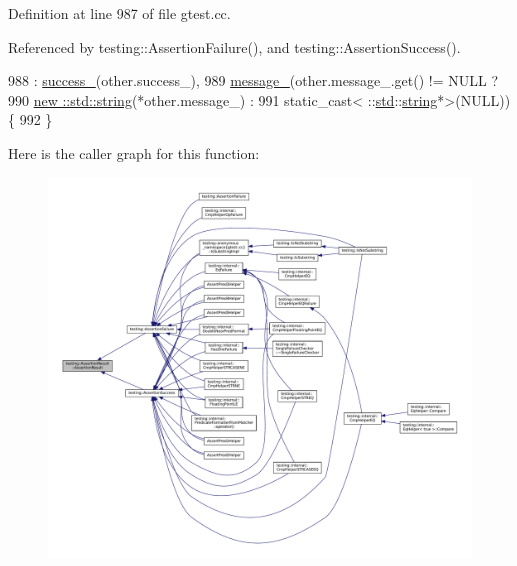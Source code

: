 Definition at line 987 of file gtest.\+cc.



Referenced by testing\+::\+Assertion\+Failure(), and testing\+::\+Assertion\+Success().


\begin{DoxyCode}
988     : \hyperlink{classtesting_1_1AssertionResult_ae7348f9fffe7a20980dfc94fc261d7ca}{success\_}(other.success\_),
989       \hyperlink{classtesting_1_1AssertionResult_a5dee995939457def35f0bf496d070957}{message\_}(other.message\_.get() != NULL ?
990                \hyperlink{namespacetesting_1_1internal_a8e8ff5b11e64078831112677156cb111}{new ::std::string}(*other.message\_) :
991                static\_cast< ::\hyperlink{namespacestd}{std}::\hyperlink{namespacetesting_1_1internal_a8e8ff5b11e64078831112677156cb111}{string}*>(NULL)) \{
992 \}
\end{DoxyCode}
Here is the caller graph for this function\+:
\nopagebreak
\begin{figure}[H]
\begin{center}
\leavevmode
\includegraphics[width=350pt]{classtesting_1_1AssertionResult_a27788116f03f90aec4daf592fd809ead_icgraph}
\end{center}
\end{figure}
\mbox{\label{classtesting_1_1AssertionResult_a9b8d1d6d0a979d0769ed4ff97d06c4e3}} 
